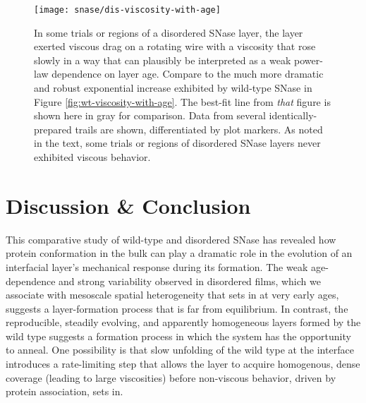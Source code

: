    \begin{figure}
    \centering
    \texttt{[image: snase/dis-viscosity-with-age]}
    \caption[The interfacial viscosity of a disordered SNase layer as a function of layer age.]{\label{fig:dis-viscosity-with-age}In some trials or regions of a disordered SNase layer, the layer exerted viscous drag on a rotating wire with a viscosity that rose slowly in a way that can plausibly be interpreted as a weak power-law dependence on layer age. Compare to the much more dramatic and robust exponential increase exhibited by wild-type SNase in Figure \ref{fig:wt-viscosity-with-age}. The best-fit line from \emph{that} figure is shown here in gray for comparison. Data from several identically-prepared trails are shown, differentiated by plot markers. As noted in the text, some trials or regions of disordered SNase layers never exhibited viscous behavior.}
    \end{figure}


\section{Discussion \& Conclusion}

This comparative study of wild-type and disordered SNase has revealed how protein conformation in the bulk can play a dramatic role in the evolution of an interfacial layer's mechanical response during its formation. The weak age-dependence and strong variability observed in disordered films, which we associate with mesoscale spatial heterogeneity that sets in at very early ages, suggests a layer-formation process that is far from equilibrium. In contrast, the reproducible, steadily evolving, and apparently homogeneous layers formed by the wild type suggests a formation process in which the system has the opportunity to anneal. One possibility is that slow unfolding of the wild type at the interface introduces a rate-limiting step that allows the layer to acquire homogenous, dense coverage (leading to large viscosities) before non-viscous behavior, driven by protein association, sets in.